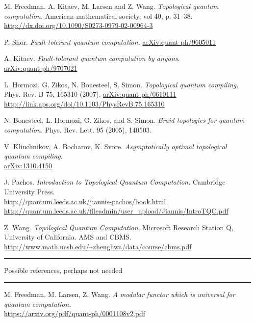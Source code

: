 \documentclass[a4paper,10pt,oneside]{book}
\theoremstyle{plain}
\theoremstyle{definition}
\theoremstyle{remark}
\begin{document}
\begin{thebibliography}{99}
    M. Freedman, A. Kitaev, M. Larsen and Z. Wang.
    \textit{Topological quantum computation.}
    American mathematical society, vol 40, p. 31–38.
    \\
    \url{http://dx.doi.org/10.1090/S0273-0979-02-00964-3}

    P. Shor.
    \textit{Fault-tolerant quantum computation.}
    \href{https://arxiv.org/abs/quant-ph/9605011}{arXiv:quant-ph/9605011}

    A. Kitaev.
    \textit{Fault-tolerant quantum computation by anyons.}
    \\
    \href{https://arxiv.org/abs/quant-ph/9707021}{arXiv:quant-ph/9707021}

    L. Hormozi, G. Zikos, N. Bonesteel, S. Simon.
    \textit{Topological quantum compiling.}
    Phys. Rev. B 75, 165310 (2007), \href{https://arxiv.org/abs/quant-ph/0610111}{arXiv:quant-ph/0610111}
    \\
    \url{http://link.aps.org/doi/10.1103/PhysRevB.75.165310}

  \bibitem{}
    N. Bonesteel, L. Hormozi, G. Zikos, and S. Simon.
    \textit{Braid topologies for quantum computation.}
    Phys. Rev. Lett. 95 (2005), 140503.

    V. Kliuchnikov, A. Bocharov, K. Svore.
    \textit{Asymptotically optimal topological quantum compiling.}
    \\
    \href{https://arxiv.org/abs/1310.4150}{arXiv:1310.4150}

    J. Pachos.
    \textit{Introduction to Topological Quantum Computation.}
    Cambridge University Press.
    \\
    \url{http://quantum.leeds.ac.uk/jiannis-pachos/book.html}
    \\
    \url{http://quantum.leeds.ac.uk/fileadmin/user_upload/Jiannis/IntroTQC.pdf}

    Z. Wang.
    \textit{Topological Quantum Computation.}
    Microsoft Research Station Q, University of California.
    AMS and CBMS.
    \url{http://www.math.ucsb.edu/~zhenghwa/data/course/cbms.pdf}

  \vspace{1cm}
  \hrule
  Possible references, perhaps not needed
  \hrule

  \bibitem{}
    M. Freedman, M. Larsen, Z. Wang.
    \textit{A modular functor which is universal for quantum computation.}
    \\
    \url{https://arxiv.org/pdf/quant-ph/0001108v2.pdf}


\end{thebibliography}
\end{document}
